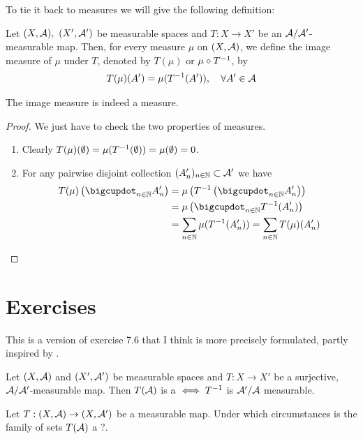 To tie it back to measures we will give the following definition:

\begin{dfn}
	Let $(X, \mathcal{A}),\ (X', \mathcal{A}')$ be measurable spaces and $T:X \to X'$ be an $\mathcal{A}/\mathcal{A}'$-measurable map. Then, for every measure $\mu$ on $(X, \mathcal{A})$, we define the image measure of $\mu$ under $T$, denoted by $T(\mu)$ or $\mu \circ {T}^{-1}$, by
	\begin{align*}
		T(\mu)(A') = \mu({T}^{-1}(A')),\quad \forall A' \in \mathcal{A}
	\end{align*}
\end{dfn}

\begin{lem}
	The image measure is indeed a measure.
\end{lem}

\begin{proof}
	We just have to check the two properties of measures.
	\begin{enumerate}
		\item Clearly $T(\mu)(\emptyset) = \mu({T}^{-1}(\emptyset)) = \mu(\emptyset) = 0$.
		\item For any pairwise disjoint collection $(A_n')_{n \in \mathbb{N}} \subset \mathcal{A}'$ we have
		\begin{align*}
			T(\mu)\left(\bigcupdot_{n \in \N} A_n'\right) &= \mu\left(\inv{T}\left(\bigcupdot_{n\in\N} A_n'\right)\right)\\
			&= \mu\left(\bigcupdot_{n \in \N} \inv{T}( A_n')\right) \\
			&= \sum_{n \in \N} \mu(\inv{T}(A_n')) = \sum_{n \in \N} T(\mu)(A_n')
		\end{align*}
	\end{enumerate}
\end{proof}

\section{Exercises}

\begin{eg}
	This is a version of exercise 7.6 that I think is more precisely formulated, partly inspired by \cite{MO1}.
	
	Let $(X, \mathcal{A})$ and $(X', \mathcal{A}')$ be measurable spaces and $T: X \to X'$ be a surjective, $\mathcal{A}/\mathcal{A}'$-measurable map. Then $T(\mathcal{A})$ is a \siga $\iff {T}^{-1}$ is $\mathcal{A}'/\mathcal{A}$ measurable.
\end{eg}

\begin{ex}
	Let $T:(X, \mathcal{A}) \to (X, \mathcal{A}')$ be a measurable map. Under which circumstances is the family of sets $T(\mathcal{A})$ a \siga?.
\end{ex}

